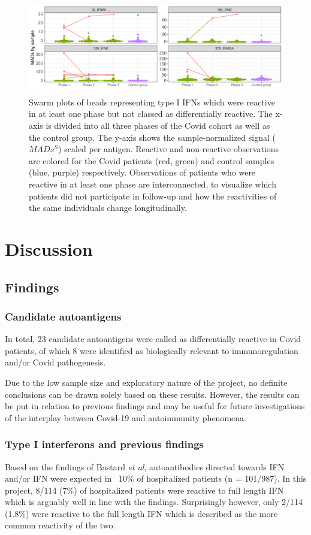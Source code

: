 \documentclass{article}
\begin{document}
\begin{figure}[H]
	\centering
    \includegraphics[width=\linewidth]{figures/gucci_other_ifn.pdf}
	\caption{Swarm plots of beads representing type I IFNs which were reactive in at least one phase but not classed as differentially reactive. The x-axis is divided into all three phases of the Covid cohort as well as the control group. The y-axis shows the sample-normalized signal ($MADs^S$) scaled per antigen. Reactive and non-reactive observations are colored for the Covid patients (red, green) and control samples (blue, purple) respectively. Observations of patients who were reactive in at least one phase are interconnected, to visualize which patients did not participate in follow-up and how the reactivities of the same individuals change longitudinally.}
	\label{gucci_ifn}
\end{figure}

\section{Discussion}
\subsection{Findings}
\subsubsection{Candidate autoantigens}
In total, 23 candidate autoantigens were called as differentially reactive in Covid patients, of which 8 were identified as biologically relevant to immunoregulation and/or Covid pathogenesis.

Due to the low sample size and exploratory nature of the project, no definite conclusions can be drawn solely based on these results. However, the results can be put in relation to previous findings and may be useful for future investigations of the interplay between Covid-19 and autoimmunity phenomena.

\subsubsection{Type I interferons and previous findings}
Based on the findings of Bastard \textit{et al}, autoantibodies directed towards IFN and/or IFN\textomega{} were expected in ~10\% of hospitalized patients (n = 101/987). In this project, 8/114 (7\%) of hospitalized patients were reactive to full length IFN\textomega{} which is arguably well in line with the findings. Surprisingly however, only 2/114 (1.8\%) were reactive to the full length IFN\textalpha{} which is described as the more common reactivity of the two. 
\end{document}
